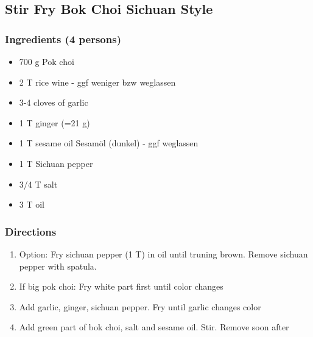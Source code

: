 \subsection{Stir Fry Bok Choi Sichuan Style}
\subsubsection*{Ingredients (4 persons)}
\begin{itemize}
\item[] 700 g	Pok choi
\item[] 2 T rice wine - ggf weniger bzw weglassen
\item[] 3-4  cloves of garlic 
\item[] 1 T ginger (=21 g)
\item[] 1 T sesame oil Sesamöl (dunkel) - ggf weglassen
\item[] 1 T Sichuan pepper
\item[] 3/4 T salt
\item[] 3 T oil
\end{itemize}
\subsubsection*{Directions}
\begin{enumerate}
\item Option: Fry sichuan pepper (1 T) in oil until truning brown. Remove sichuan pepper with spatula.
\item If big pok choi: Fry white part first until color changes
\item Add garlic, ginger, sichuan pepper. Fry until garlic changes color
\item Add green part of bok choi, salt and sesame oil. Stir. Remove soon after
\end{enumerate}
\pagebreak

